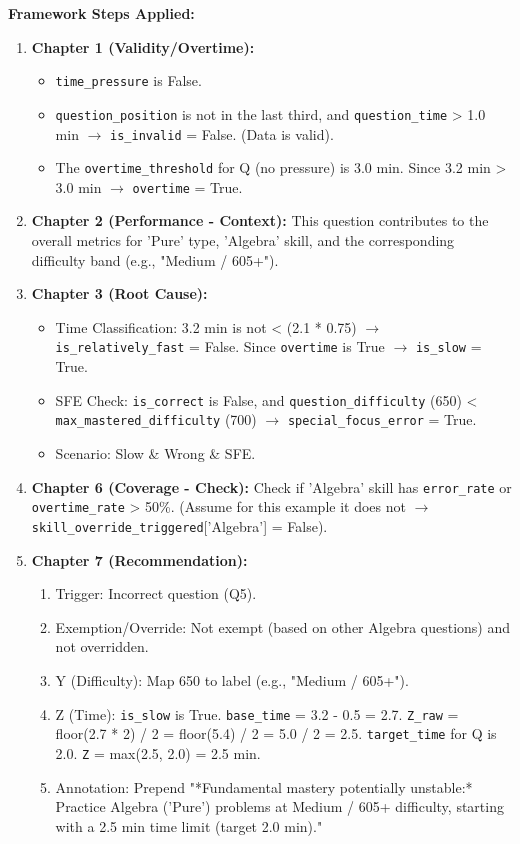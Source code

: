 \documentclass{article}
\begin{document}
\textbf{Framework Steps Applied:}
\begin{enumerate}
    \item \textbf{Chapter 1 (Validity/Overtime):} 
        \begin{itemize}
            \item \texttt{time\_pressure} is False. 
            \item \texttt{question\_position} is not in the last third, and \texttt{question\_time} > 1.0 min $\rightarrow$ \texttt{is\_invalid} = False. (Data is valid).
            \item The \texttt{overtime\_threshold} for Q (no pressure) is 3.0 min. Since 3.2 min > 3.0 min $\rightarrow$ \texttt{overtime} = True.
        \end{itemize}
    \item \textbf{Chapter 2 (Performance - Context):} This question contributes to the overall metrics for 'Pure' type, 'Algebra' skill, and the corresponding difficulty band (e.g., "Medium / 605+").
    \item \textbf{Chapter 3 (Root Cause):}
        \begin{itemize}
            \item Time Classification: 3.2 min is not < (2.1 * 0.75) $\rightarrow$ \texttt{is\_relatively\_fast} = False. Since \texttt{overtime} is True $\rightarrow$ \texttt{is\_slow} = True.
            \item SFE Check: \texttt{is\_correct} is False, and \texttt{question\_difficulty} (650) < \texttt{max\_mastered\_difficulty} (700) $\rightarrow$ \texttt{special\_focus\_error} = True.
            \item Scenario: Slow \& Wrong \& SFE.
        \end{itemize}
    \item \textbf{Chapter 6 (Coverage - Check):} Check if 'Algebra' skill has \texttt{error\_rate} or \texttt{overtime\_rate} > 50\%. (Assume for this example it does not $\rightarrow$ \texttt{skill\_override\_triggered}['Algebra'] = False).
    \item \textbf{Chapter 7 (Recommendation):}
        \begin{enumerate}
            \item Trigger: Incorrect question (Q5).
            \item Exemption/Override: Not exempt (based on other Algebra questions) and not overridden.
            \item Y (Difficulty): Map 650 to label (e.g., "Medium / 605+").
            \item Z (Time): \texttt{is\_slow} is True. \texttt{base\_time} = 3.2 - 0.5 = 2.7. \texttt{Z\_raw} = floor(2.7 * 2) / 2 = floor(5.4) / 2 = 5.0 / 2 = 2.5. \texttt{target\_time} for Q is 2.0. \texttt{Z} = max(2.5, 2.0) = 2.5 min.
            \item Annotation: Prepend "*Fundamental mastery potentially unstable:* Practice Algebra ('Pure') problems at Medium / 605+ difficulty, starting with a 2.5 min time limit (target 2.0 min)."
        \end{enumerate}
\end{enumerate}
\end{document}
